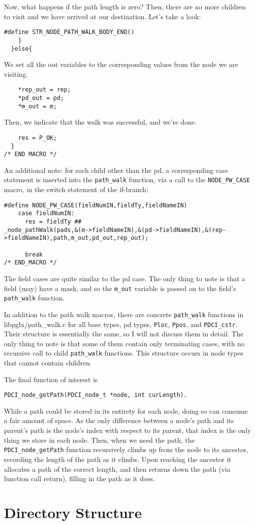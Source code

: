 \documentclass{article}
\begin{document}
Now, what happens if the path length is zero? Then, there are no more 
children to visit and we have arrived at our destination. Let's take a look:

\begin{verbatim}
#define STR_NODE_PATH_WALK_BODY_END()
    }
  }else{
\end{verbatim}

We set all the out variables to the corresponding values from the node 
we are visiting.

\begin{verbatim}
    *rep_out = rep;
    *pd_out = pd;
    *m_out = m;
\end{verbatim}

Then, we indicate that the walk was successful, and we're done.
\begin{verbatim}
    res = P_OK;
  }
/* END MACRO */
\end{verbatim}

  An additional note: for each child other than the pd, a corresponding 
case statement is inserted into the \verb+path_walk+ function, via a call to 
the \verb+NODE_PW_CASE+ macro, in the switch statement of the if-branch:

\begin{verbatim}
#define NODE_PW_CASE(fieldNumIN,fieldTy,fieldNameIN)
    case fieldNumIN:
      res = fieldTy ## 
_node_pathWalk(pads,&(m->fieldNameIN),&(pd->fieldNameIN),&(rep->fieldNameIN),path,m_out,pd_out,rep_out);      

      break
/* END_MACRO */
\end{verbatim}

The field cases are quite similar to the pd case. The only thing to note 
is that a field (may) have a mask, and so the \verb+m_out+ variable is passed 
on to the field's \verb+path_walk+ function.

In addition to the path walk macros, there are concrete
\verb+path_walk+ functions in libpglx/path\_walk.c for all base types,
pd types, \verb+Ploc+, \verb+Ppos+, and \verb+PDCI_cstr+. Their
structure is essentially the same, so I will not discuss them in
detail. The only thing to note is that some of them contain only
terminating cases, with no recursive call to child \verb+path_walk+
functions. This structure occurs in node types that cannot contain
children.

The final function of interest is 
\begin{verbatim}
PDCI_node_getPath(PDCI_node_t *node, int curLength). 
\end{verbatim}
While a path could be stored in its entirety for each 
node, doing so can consume a fair amount of space. As the only 
difference between a node's path and its parent's path is the node's 
index with respect to its parent, that index is the only thing we store 
in each node. Then, when we need the path, the \verb+PDCI_node_getPath+
function recursively climbs up from the node to its ancestor, recording 
the length of the path as it climbs. Upon reaching the ancestor it 
allocates a path of the correct length, and then returns down the path 
(via function call return), filling in the path as it does.

\appendix


\section{Directory Structure}
\end{document}
